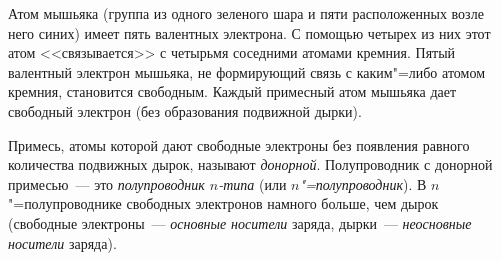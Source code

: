 \documentclass[main.tex]{subfiles}
\begin{document}
Атом мышьяка (группа из одного зеленого шара и пяти расположенных возле него синих) имеет пять валентных электрона. С помощью четырех из них этот атом <<связывается>> с четырьмя соседними атомами кремния. Пятый валентный электрон мышьяка, не формирующий связь с каким"=либо атомом кремния, становится свободным.
Каждый примесный атом мышьяка дает свободный электрон (без образования подвижной дырки).

Примесь, атомы которой дают свободные электроны без появления равного количества подвижных дырок, называют \emph{донорной}. Полупроводник с донорной примесью~--- это \emph{полупроводник $n$-типа} (или \emph{$n$"=полупроводник}). В $n$"=полупроводнике свободных электронов намного больше, чем дырок (свободные электроны~--- \emph{основные носители} заряда, дырки~--- \emph{неосновные носители} заряда). 























 
\end{document}
